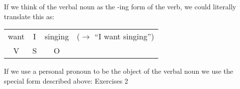 \noindent If we think of the verbal noun as the -ing form of the verb, we could literally translate this as:
\begin{table}[H]
\begin{tabu}{cccc}
  want & I & singing & ($\rightarrow$ ``I want singing'')\\
  V & S & O & 
\end{tabu}
\label{verbal_noun_ing_form}
\end{table}

\noindent If we use a personal pronoun to be the object of the verbal noun we use the special form described above:
\noindent Exercises 2

